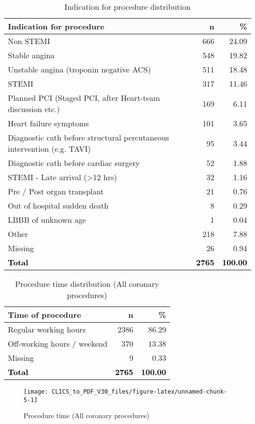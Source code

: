 \documentclass[
]{article}
\begin{document}
\begin{longtable}[t]{lrr}
\caption{\label{tab:table 13}Indication for procedure distribution}\\
\toprule
Indication for procedure & n & \%\\
\midrule
Non STEMI & 666 & 24.09\\
Stable angina & 548 & 19.82\\
Unstable angina (troponin negative ACS) & 511 & 18.48\\
STEMI & 317 & 11.46\\
Planned PCI (Staged PCI, after Heart-team discussion etc.) & 169 & 6.11\\
\addlinespace
Heart failure symptoms & 101 & 3.65\\
Diagnostic cath before structural percutaneous intervention (e.g. TAVI) & 95 & 3.44\\
Diagnostic cath before cardiac surgery & 52 & 1.88\\
STEMI - Late arrival (>12 hrs) & 32 & 1.16\\
Pre / Post organ transplant & 21 & 0.76\\
\addlinespace
Out of hospital sudden death & 8 & 0.29\\
LBBB of unknown age & 1 & 0.04\\
Other & 218 & 7.88\\
Missing & 26 & 0.94\\
\textcolor{black}{\textbf{Total}} & \textcolor{black}{\textbf{2765}} & \textcolor{black}{\textbf{100.00}}\\
\bottomrule
\end{longtable}

\clearpage

\begin{longtable}[t]{lrr}
\caption{\label{tab:table 14}Procedure time distribution (All coronary procedures)}\\
\toprule
Time of procedure & n & \%\\
\midrule
Regular working hours & 2386 & 86.29\\
Off-working hours / weekend & 370 & 13.38\\
Missing & 9 & 0.33\\
\textcolor{black}{\textbf{Total}} & \textcolor{black}{\textbf{2765}} & \textcolor{black}{\textbf{100.00}}\\
\bottomrule
\end{longtable}

\begin{figure}[H]

{\centering \texttt{[image: CLICS\_to\_PDF\_V30\_files/figure-latex/unnamed-chunk-5-1]} 

}

\caption{Procedure time (All coronary procedures)}\label{fig:unnamed-chunk-5}
\end{figure}
\clearpage
\end{document}
